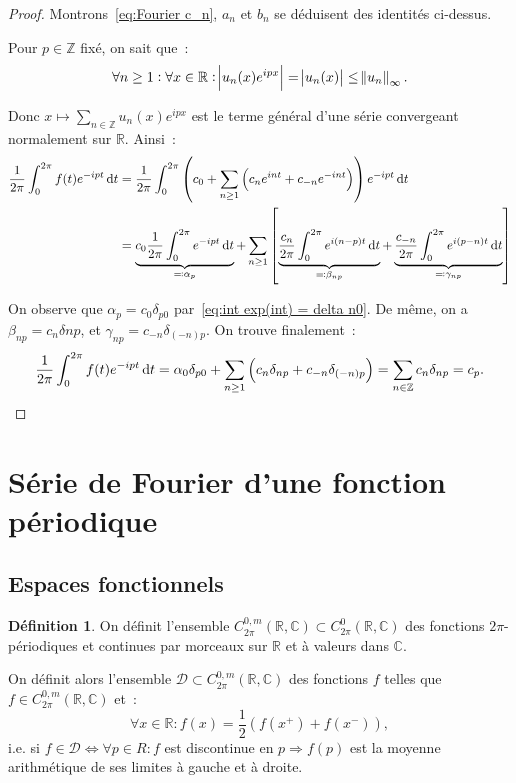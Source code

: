 \documentclass{report}
\theoremstyle{definition}
\newtheorem{déf}[thm]{Définition}
\theoremstyle{remark}
\numberwithin{equation}{section}
\newcommand{\C}{\mathbb C}
\newcommand{\R}{\mathbb R}
\newcommand{\Z}{\mathbb Z}
\newcommand{\CmT}[2]{C^{#1,m}_{#2}}
\newcommand{\CzmT}[1]{\CmT 0{#1}}
\newcommand{\Czm}{\CzmT{2\pi}}
\begin{document}
			\begin{proof} Montrons~\eqref{eq:Fourier c_n}, $a_n$ et $b_n$ se déduisent des identités ci-dessus.

			Pour $p \in \Z$ fixé, on sait que~:
			\begin{equation}
				\forall n \geq 1 : \forall x \in \R : \abs {u_n(x)e^{ipx}} = \abs {u_n(x)} \leq \norm {u_n}_\infty.
			\end{equation}

			Donc $x \mapsto \sum_{n \in \Z}u_n(x)e^{ipx}$ est le terme général d'une série convergeant normalement sur $\R$. Ainsi~:
			\begin{align}
				\frac 1{2\pi} \int_0^{2\pi}f(t)e^{-ipt}\dif t &= \frac 1{2\pi}\int_0^{2\pi}\left(c_0 + \sum_{n \geq 1}\left(c_ne^{int} + c_{-n}e^{-int}\right)\right)e^{-ipt}\dif t \\
					&= \underbrace {c_0\frac 1{2\pi}\int_0^{2\pi}e^{-ipt}\dif t}_{\eqqcolon \alpha_p}
						+ \sum_{n \geq 1}\left[\underbrace {\frac {c_n}{2\pi}\int_0^{2\pi}e^{i(n-p)t}\dif t}_{\eqqcolon \beta_{np}}
							+ \underbrace {\frac {c_{-n}}{2\pi}\int_0^{2\pi}e^{i(p-n)t}\dif t}_{\eqqcolon \gamma_{np}}\right]
			\end{align}

			On observe que $\alpha_p = c_0\delta_{p0}$ par~\eqref{eq:int exp(int) = delta n0}. De même, on a $\beta_{np} = c_n\delta{np}$, et $\gamma_{np}
				= c_{-n}\delta_{(-n)p}$.
			On trouve finalement~:
			\begin{equation}
				\frac 1{2\pi}\int_0^{2\pi}f(t)e^{-ipt}\dif t = \alpha_0\delta_{p0} + \sum_{n \geq 1}\left(c_n\delta_{np} + c_{-n}\delta_{(-n)p}\right)
					= \sum_{n \in \Z}c_n\delta_{np} = c_p.
			\end{equation}
			\end{proof}

	\section{Série de Fourier d'une fonction périodique}
		\subsection{Espaces fonctionnels}
			\begin{déf} On définit l'ensemble $\Czm(\R, \C) \subset C^0_{2\pi}(\R, \C)$ des fonctions $2\pi$-périodiques et continues par morceaux sur $\R$ et
			à valeurs dans $\C$.

			On définit alors l'ensemble $\mathcal D \subset \Czm(\R, \C)$ des fonctions $f$ telles que $f \in \Czm(\R, \C)$ et~:
			\begin{equation}
				\forall x \in \R : f(x) = \frac 12(f(x^+)+f(x^-)),
			\end{equation}
			i.e. si $f \in \mathcal D \iff \forall p \in R : f$ est discontinue en $p \Rightarrow f(p)$ est la moyenne arithmétique de ses limites à gauche et à droite.
			\end{déf}
\end{document}
